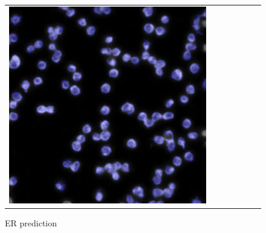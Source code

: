\begin{figure}[H]
\begin{tabularx}{\textwidth}{YYYYYYY}
            \includegraphics{bilder/ER/segmentation/pp_7.png} 
        \end{tabularx}
    \caption{ER prediction}
    \label{fig:er-prediction}
\end{figure}
